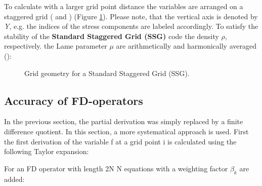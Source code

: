 \documentclass{hitec}
\begin{document}

To calculate with a larger grid point distance the variables are arranged on a staggered grid (\cite{virieux:86} and \cite{levander:88}) (Figure \ref{fig_cell}).  Please note, that the vertical axis is denoted by \textit{Y}, e.g. the indices of the stress components are labeled accordingly. To satisfy the stability of the {\bf{Standard Staggered Grid (SSG)}} code the density $\rho$, respectively. the Lame parameter $\mu$ are arithmetically and harmonically averaged (\cite{bohlen:06}):

\begin{figure}[ht]
\begin{center}
\caption{\label{fig_cell} Grid geometry for a Standard Staggered Grid (SSG).}
\end{center}
\end{figure}   




\newpage
\subsection{Accuracy of FD-operators}
In the previous section, the partial derivation was simply replaced by a finite difference quotient. In this section, a more systematical approach  is used. First the first derivation of the variable f at a grid point i is calculated using the following Taylor expansion:


For an FD operator with length 2N N equations with a weighting factor $\beta_k$ are added:

\end{document}
